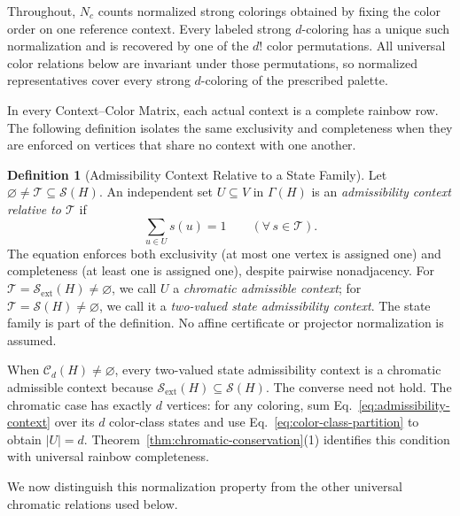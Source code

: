 \documentclass[aps,pra,reprint,superscriptaddress,longbibliography,nofootinbib,floatfix,10pt]{revtex4-2}
\theoremstyle{definition}\newtheorem{definition}[theorem]{Definition}
\theoremstyle{remark}\newtheorem{remark}[theorem]{Remark}
\newcommand{\Sc}{\mathcal S}\newcommand{\Cc}{\mathcal C}\newcommand{\Wc}{\mathcal W}
\begin{document}
Throughout, $N_c$ counts normalized strong colorings obtained by fixing the color order on one reference context. Every labeled strong $d$-coloring has a unique such normalization and is recovered by one of the $d!$ color permutations. All universal color relations below are invariant under those permutations, so normalized representatives cover every strong $d$-coloring of the prescribed palette.

In every Context--Color Matrix, each actual context is a complete rainbow row. The following definition isolates the same exclusivity and completeness when they are enforced on vertices that share no context with one another.

\begin{definition}[Admissibility Context Relative to a State Family]\label{def:admissibility-context}
Let $\varnothing\neq\mathcal T\subseteq\Sc(H)$. An independent set $U\subseteq V$ in $\Gamma(H)$ is an \emph{admissibility context relative to $\mathcal T$} if
\begin{equation}\label{eq:admissibility-context}
\sum_{u\in U}s(u)=1\qquad(\forall\,s\in\mathcal T).
\end{equation}
The equation enforces both exclusivity (at most one vertex is assigned one) and completeness (at least one is assigned one), despite pairwise nonadjacency. For $\mathcal T=\Sc_{\mathrm{ext}}(H)\neq\varnothing$, we call $U$ a \emph{chromatic admissible context}; for $\mathcal T=\Sc(H)\neq\varnothing$, we call it a \emph{two-valued state admissibility context}. The state family is part of the definition. No affine certificate or projector normalization is assumed.
\end{definition}

When $\Cc_d(H)\neq\varnothing$, every two-valued state admissibility context is a chromatic admissible context because $\Sc_{\mathrm{ext}}(H)\subseteq\Sc(H)$. The converse need not hold. The chromatic case has exactly $d$ vertices: for any coloring, sum Eq.~\eqref{eq:admissibility-context} over its $d$ color-class states and use Eq.~\eqref{eq:color-class-partition} to obtain $|U|=d$. Theorem~\ref{thm:chromatic-conservation}(1) identifies this condition with universal rainbow completeness.

We now distinguish this normalization property from the other universal chromatic relations used below.
\end{document}

